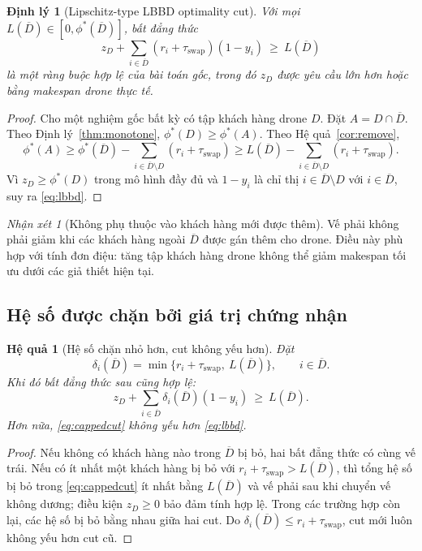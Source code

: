 \documentclass[11pt,a4paper]{article}
\theoremstyle{definition}
\theoremstyle{plain}
\newtheorem{theorem}{Định lý}[section]
\newtheorem{corollary}{Hệ quả}[section]
\theoremstyle{remark}
\newtheorem{remark}{Nhận xét}[section]
\newcommand{\sw}{\tau_{\mathrm{swap}}}
\newcommand{\opt}{\phi^*}
\newcommand{\barD}{\overline D}
\begin{document}
\begin{theorem}[Lipschitz-type LBBD optimality cut]\label{thm:cut}
Với mọi $L(\barD)\in[0,\opt(\barD)]$, bất đẳng thức
\begin{equation}\label{eq:lbbd}
\boxed{\quad z_D+\sum_{i\in\barD}(r_i+\sw)(1-y_i)\ \ge\ L(\barD)\quad}
\end{equation}
là một ràng buộc hợp lệ của bài toán gốc, trong đó $z_D$ được yêu cầu lớn hơn hoặc bằng makespan drone thực tế.
\end{theorem}
\begin{proof}
Cho một nghiệm gốc bất kỳ có tập khách hàng drone $D$. Đặt $A=D\cap\barD$. Theo Định lý~\ref{thm:monotone}, $\opt(D)\ge\opt(A)$. Theo Hệ quả~\ref{cor:remove},
\[
\opt(A)\ge\opt(\barD)-\sum_{i\in\barD\setminus D}(r_i+\sw)
\ge L(\barD)-\sum_{i\in\barD\setminus D}(r_i+\sw).
\]
Vì $z_D\ge\opt(D)$ trong mô hình đầy đủ và $1-y_i$ là chỉ thị $i\in\barD\setminus D$ với $i\in\barD$, suy ra \eqref{eq:lbbd}.
\end{proof}

\begin{remark}[Không phụ thuộc vào khách hàng mới được thêm]
Vế phải không phải giảm khi các khách hàng ngoài $\barD$ được gán thêm cho drone. Điều này phù hợp với tính đơn điệu: tăng tập khách hàng drone không thể giảm makespan tối ưu dưới các giả thiết hiện tại.
\end{remark}

\subsection{Hệ số được chặn bởi giá trị chứng nhận}
\begin{corollary}[Hệ số chặn nhỏ hơn, cut không yếu hơn]\label{cor:cap}
Đặt
\begin{equation}\label{eq:capped}
\delta_i(\barD)=\min\{r_i+\sw,\ L(\barD)\},\qquad i\in\barD.
\end{equation}
Khi đó bất đẳng thức sau cũng hợp lệ:
\begin{equation}\label{eq:cappedcut}
\boxed{\quad z_D+\sum_{i\in\barD}\delta_i(\barD)(1-y_i)\ \ge\ L(\barD).\quad}
\end{equation}
Hơn nữa, \eqref{eq:cappedcut} không yếu hơn \eqref{eq:lbbd}.
\end{corollary}
\begin{proof}
Nếu không có khách hàng nào trong $\barD$ bị bỏ, hai bất đẳng thức có cùng vế trái. Nếu có ít nhất một khách hàng bị bỏ với $r_i+\sw>L(\barD)$, thì tổng hệ số bị bỏ trong \eqref{eq:cappedcut} ít nhất bằng $L(\barD)$ và vế phải sau khi chuyển vế không dương; điều kiện $z_D\ge0$ bảo đảm tính hợp lệ. Trong các trường hợp còn lại, các hệ số bị bỏ bằng nhau giữa hai cut. Do $\delta_i(\barD)\le r_i+\sw$, cut mới luôn không yếu hơn cut cũ.
\end{proof}
\end{document}
